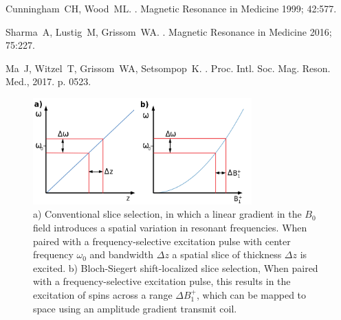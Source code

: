 \documentclass{article}
\begin{document}
\begin{thebibliography}{10}
Cunningham~CH, Wood~ML.
.
\newblock Magnetic Resonance in Medicine 1999; 42:577.

Sharma~A, Lustig~M, Grissom~WA.
.
\newblock Magnetic Resonance in Medicine 2016; 75:227.

Ma~J, Witzel~T, Grissom~WA, Setsompop~K.
.
 Proc. Intl. Soc.
  Mag. Reson. Med., 2017.  p. 0523.

\end{thebibliography}

\newpage

\begin{figure}[h]
\centering
\includegraphics[width=0.75\textwidth]{figures/intro_figure.png}
\caption{a) Conventional slice selection, in which a linear gradient in the $B_0$ field introduces a spatial variation in resonant frequencies. 
When paired with a frequency-selective excitation pulse with center frequency $\omega_0$ and bandwidth $\Delta z$ a spatial slice of thickness $\Delta z$ is excited. 
b) Bloch-Siegert shift-localized slice selection, 
When paired with a frequency-selective excitation pulse, this results in the excitation of spins across a range $\Delta B_1^+$, which can be mapped to space using an amplitude gradient transmit coil.}
\label{fig:intro}
\end{figure}
\end{document}
